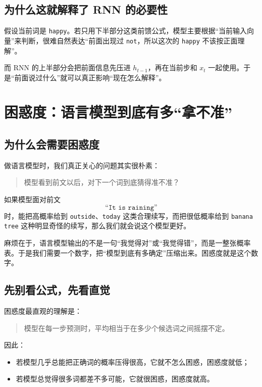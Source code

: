 \documentclass[12pt,a4paper]{ctexart}
\begin{document}
\subsection{为什么这就解释了 RNN 的必要性}

假设当前词是 \texttt{happy}。若只用下半部分这类前馈公式，模型主要根据“当前输入向量”来判断，很难自然表达“前面出现过 \texttt{not}，所以这次的 \texttt{happy} 不该按正面理解”。

而 RNN 的上半部分会把前面信息先压进 \(h_{t-1}\)，再在当前步和 \(x_t\) 一起使用。于是“前面说过什么”就可以真正影响“现在怎么解释”。

\section{困惑度：语言模型到底有多“拿不准”}

\subsection{为什么会需要困惑度}

做语言模型时，我们真正关心的问题其实很朴素：
\begin{quote}
模型看到前文以后，对下一个词到底猜得准不准？
\end{quote}

如果模型面对前文
\[
\texttt{``It is raining''}
\]
时，能把高概率给到 \texttt{outside}、\texttt{today} 这类合理续写，而把很低概率给到 \texttt{banana tree} 这种明显奇怪的续写，那么我们就会说这个模型更好。

麻烦在于，语言模型输出的不是一句“我觉得对”或“我觉得错”，而是一整张概率表。于是我们需要一个数字，把“模型到底有多确定”压缩出来。困惑度就是这个数字。

\subsection{先别看公式，先看直觉}

困惑度最直观的理解是：
\begin{quote}
模型在每一步预测时，平均相当于在多少个候选词之间摇摆不定。
\end{quote}

因此：
\begin{itemize}
  \item 若模型几乎总能把正确词的概率压得很高，它就不怎么困惑，困惑度就低；
  \item 若模型总觉得很多词都差不多可能，它就很困惑，困惑度就高。
\end{itemize}
\end{document}
